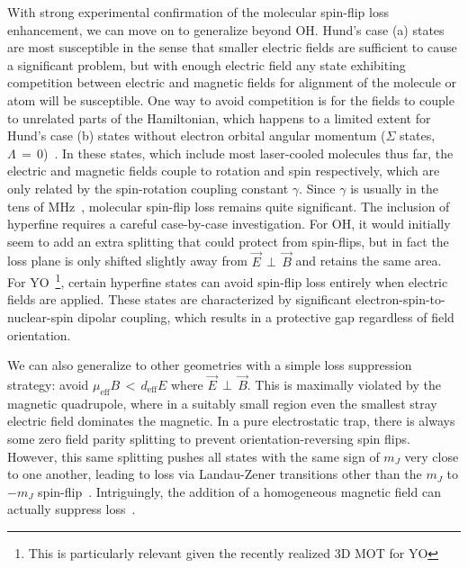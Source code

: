 \documentclass[%
 reprint,
 amsmath,amssymb,
 aps,
prl,
]{revtex4-1}
\newcommand{\epb}{{$\vec{E}\,{\perp}\,\vec{B}$}}
\begin{document}
With strong experimental confirmation of the molecular spin-flip loss enhancement, we can move on to generalize beyond OH.
Hund's case (a) states are most susceptible in the sense that smaller electric fields are sufficient to cause a significant problem, but with enough electric field any state exhibiting competition between electric and magnetic fields for alignment of the molecule or atom will be susceptible. 
One way to avoid competition is for the fields to couple to unrelated parts of the Hamiltonian, which happens to a limited extent for Hund's case (b) states without electron orbital angular momentum ($\Sigma$ states, $\Lambda\,{=}\,0$)~\cite{Bohn2013}. 
In these states, which include most laser-cooled molecules thus far, the electric and magnetic fields couple to rotation and spin respectively, which are only related by the spin-rotation coupling constant $\gamma$.
Since $\gamma$ is usually in the tens of MHz~\cite{Quemener2016}, molecular spin-flip loss remains quite significant.
The inclusion of hyperfine requires a careful case-by-case investigation. For OH, it would initially seem to add an extra splitting that could protect from spin-flips, but in fact the loss plane is only shifted slightly away from \epb{} and retains the same area.
For YO~\footnote{This is particularly relevant given the recently realized 3D MOT for YO}, certain hyperfine states can avoid spin-flip loss entirely when electric fields are applied. 
These states are characterized by significant electron-spin-to-nuclear-spin dipolar coupling, which results in a protective gap regardless of field orientation. %

We can also generalize to other geometries with a simple loss suppression strategy: avoid $\mu_\text{eff}B \,{<}\, d_\text{eff}E$ where \epb.
This is maximally violated by the magnetic quadrupole, where in a suitably small region even the smallest stray electric field dominates the magnetic.
In a pure electrostatic trap, there is always some zero field parity splitting to prevent orientation-reversing spin flips.
However, this same splitting pushes all states with the same sign of $m_J$ very close to one another, leading to loss via Landau-Zener transitions other than the $m_J$ to $-m_J$ spin-flip~\cite{Wall2010}.
Intriguingly, the addition of a homogeneous magnetic field can actually suppress loss~\cite{Meek2011}.
\end{document}
